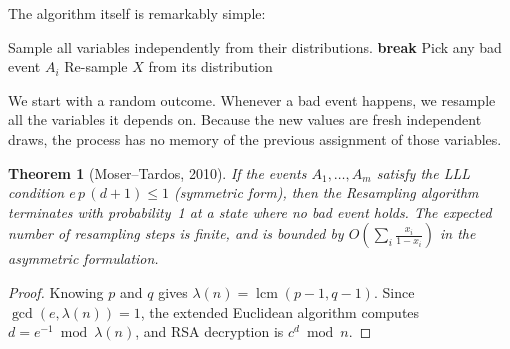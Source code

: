 \documentclass[twoside,12pt]{book}
\theoremstyle{plain}
\newtheorem{theorem}{Theorem}[chapter]
\theoremstyle{definition}
\theoremstyle{remark}
\begin{document}
The algorithm itself is remarkably simple:

\begin{algorithm}[H]
\caption{Moser--Tardos Resampling}
\label{alg:mosertardos}
\begin{algorithmic}[1]
\State Sample all variables independently from their distributions.
\Loop
      \State \textbf{break}
   \Else
      \State Pick any bad event $A_i$
         \State Re-sample $X$ from its distribution
      \EndFor
   \EndIf
\EndLoop
\end{algorithmic}
\end{algorithm}

We start with a random outcome. Whenever a bad event happens, we
resample all the variables it depends on. Because the new values are
fresh independent draws, the process has no memory of the previous
assignment of those variables.

\begin{theorem}[Moser--Tardos, 2010]
\label{thm:algorithmic-lll}
If the events $A_1,\ldots,A_m$ satisfy the LLL condition
$e\,p\,(d+1) \le 1$ (symmetric form), then the Resampling algorithm
terminates with probability~1 at a state where no bad event holds. The
expected number of resampling steps is finite, and is bounded by
$O\!\left(\sum_i \frac{x_i}{1-x_i}\right)$ in the asymmetric
formulation.
\end{theorem}

\begin{proof}
Knowing $p$ and $q$ gives $\lambda(n)=\operatorname{lcm}(p-1,q-1)$.
Since $\gcd(e,\lambda(n))=1$, the extended Euclidean algorithm computes
$d=e^{-1}\bmod\lambda(n)$, and RSA decryption is $c^d\bmod n$.

\end{proof}
\end{document}
